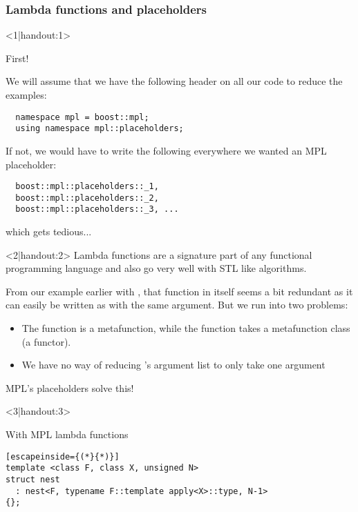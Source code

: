 \documentclass[11pt,a4paper,dvipsnames,usenames]{beamer}
\begin{document}
\begin{frame}[fragile]
  \frametitle{Lambda functions and placeholders}

  \vfill

  \begin{onlyenv}<1|handout:1>

  First!

  \vspace{1em}

  We will assume that we have the following header on all our code to reduce the examples:
  \begin{lstlisting}
  namespace mpl = boost::mpl;
  using namespace mpl::placeholders;
  \end{lstlisting}

  If not, we would have to write the following everywhere we wanted an MPL placeholder:
  \begin{lstlisting}
  boost::mpl::placeholders::_1,
  boost::mpl::placeholders::_2,
  boost::mpl::placeholders::_3, ...
  \end{lstlisting}

  which gets tedious...
  \end{onlyenv}

  \begin{onlyenv}<2|handout:2>
    Lambda functions are a signature part of any functional programming language and also go very well
    with STL like algorithms.

    \vfill
    
    From our example earlier with , that function in itself seems a bit redundant as it
    can easily be written as  with the same argument. But we run into two problems:

    \vfill

    \begin{itemize}
      \item The  function is a metafunction, while the  function takes a metafunction class (a
        functor).
      \item We have no way of reducing 's argument list to only take one argument
    \end{itemize}

    \vfill

    MPL's placeholders solve this!
  \end{onlyenv}

  \begin{onlyenv}<3|handout:3>
  \begin{exampleblock}{With MPL lambda functions}
  \begin{lstlisting}[escapeinside={(*}{*)}]
template <class F, class X, unsigned N>
struct nest
  : nest<F, typename F::template apply<X>::type, N-1>
{};


\end{lstlisting}
\end{exampleblock}
\end{onlyenv}
\end{frame}
\end{document}

